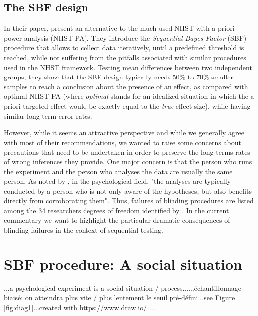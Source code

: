 \documentclass[a4paper,man,natbib,floatsintext,donotrepeattitle]{apa6}
\begin{document}
\subsection{The SBF design}

In their paper, \cite{schonbrodt_sequential_2017} present an alternative to the much used NHST with a priori power analysis (NHST-PA). They introduce the \textit{Sequential Bayes Factor} (SBF) procedure that allows to collect data iteratively, until a predefined threshold is reached, while not suffering from the pitfalls associated with similar procedures used in the NHST framework. Testing mean differences between two independent groups, they show that the SBF design typically needs 50\% to 70\% smaller samples to reach a conclusion about the presence of an effect, as compared with optimal NHST-PA (where \textit{optimal} stands for an idealized situation in which the a priori targeted effect would be exactly equal to the \textit{true} effect size), while having similar long-term error rates.


However, while it seems an attractive perspective and while we generally agree with most of their recommendations, we wanted to raise some concerns about precautions that need to be undertaken in order to preserve the long-terms rates of wrong inferences they provide. One major concern is that the person who runs the experiment and the person who analyses the data are usually the same person. As noted by \cite{wicherts_degrees_2016}, in the psychological field, "the analyses are typically conducted by a person who is not only aware of the hypotheses, but also benefits directly from corroborating them". Thus, failures of blinding procedures are listed among the 34 researchers degrees of freedom identified by \cite{wicherts_degrees_2016}. In the current commentary we want to highlight the particular dramatic consequences of blinding failures in the context of sequential testing.

\section{SBF procedure: A social situation}

...a psychological experiment is a social situation / process...\cite{rosenthal_social_1963,rosenthal_experimenter_1964}...échantillonnage biaisé: on atteindra plus vite / plus lentement le seuil pré-défini...see Figure \ref{fig:diag1}...created with https://www.draw.io/ ...
\end{document}
